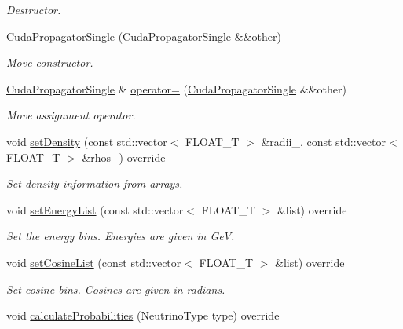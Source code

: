 \begin{DoxyCompactItemize}
\begin{DoxyCompactList}\small\item\em Destructor. \end{DoxyCompactList}\item 
\hyperlink{classcudaprob3_1_1CudaPropagatorSingle_aa97189759f1c36bc173db642529081e8}{Cuda\+Propagator\+Single} (\hyperlink{classcudaprob3_1_1CudaPropagatorSingle}{Cuda\+Propagator\+Single} \&\&other)
\begin{DoxyCompactList}\small\item\em Move constructor. \end{DoxyCompactList}\item 
\hyperlink{classcudaprob3_1_1CudaPropagatorSingle}{Cuda\+Propagator\+Single} \& \hyperlink{classcudaprob3_1_1CudaPropagatorSingle_af02384c6b9143b00b8e8870d3be35ca1}{operator=} (\hyperlink{classcudaprob3_1_1CudaPropagatorSingle}{Cuda\+Propagator\+Single} \&\&other)
\begin{DoxyCompactList}\small\item\em Move assignment operator. \end{DoxyCompactList}\item 
void \hyperlink{classcudaprob3_1_1CudaPropagatorSingle_ad2aba9c12a96f429a8ee675c865ceccf}{set\+Density} (const std\+::vector$<$ F\+L\+O\+A\+T\+\_\+T $>$ \&radii\+\_\+, const std\+::vector$<$ F\+L\+O\+A\+T\+\_\+T $>$ \&rhos\+\_\+) override
\begin{DoxyCompactList}\small\item\em Set density information from arrays. \end{DoxyCompactList}\item 
void \hyperlink{classcudaprob3_1_1CudaPropagatorSingle_a0f31f396035587744335cc6907124066}{set\+Energy\+List} (const std\+::vector$<$ F\+L\+O\+A\+T\+\_\+T $>$ \&list) override
\begin{DoxyCompactList}\small\item\em Set the energy bins. Energies are given in GeV. \end{DoxyCompactList}\item 
void \hyperlink{classcudaprob3_1_1CudaPropagatorSingle_ab246f402045676c70d8b9eb5cf8e406d}{set\+Cosine\+List} (const std\+::vector$<$ F\+L\+O\+A\+T\+\_\+T $>$ \&list) override
\begin{DoxyCompactList}\small\item\em Set cosine bins. Cosines are given in radians. \end{DoxyCompactList}\item 
void \hyperlink{classcudaprob3_1_1CudaPropagatorSingle_a3955e2e44178fd6586cdeec77d597139}{calculate\+Probabilities} (Neutrino\+Type type) override

\end{DoxyCompactItemize}
